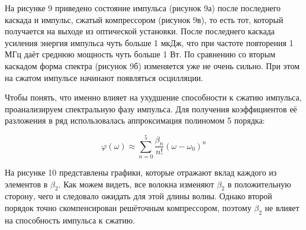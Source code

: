 \documentclass[12pt]{article}
\begin{document}
На рисунке 9 приведено состояние импульса (рисунок 9а) после последнего каскада и импульс, сжатый компрессором (рисунок 9в),
то есть тот, который получается на выходе из оптической установки. После последнего каскада усиления энергия импульса чуть
больше 1 мкДж, что при частоте повторения 1 МГц даёт среднюю мощность чуть больше 1 Вт. По сравнению со вторым каскадом
форма спектра (рисунок 9б) изменяется уже не очень сильно. При этом на сжатом импульсе начинают появляться осцилляции.

Чтобы понять, что именно влияет на ухудшение способности к сжатию импульса, проанализируем спектральную фазу импульса.
Для получения коэффициентов её разложения в ряд использовалась аппроксимация полиномом 5 порядка:

\begin{equation}
    \varphi(\omega) \approx \sum_{n=0}^5 \frac{\beta_n}{n!} (\omega - \omega_0)^n
\end{equation}

На рисунке 10 представлены графики, которые отражают вклад каждого из элементов в $\beta_2$.
Как можем видеть, все волокна изменяют $\beta_2$ в положительную сторону, чего и следовало ожидать для этой длины волны.
Однако второй порядок точно скомпенсирован решёточным компрессором, поэтому $\beta_2$ не влияет на способность импульса
к сжатию.
\end{document}
